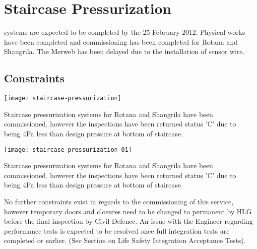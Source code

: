 
\chapter{Staircase Pressurization}
\label{pressurization}


 systems are expected to be completed by the 25 February 2012. Physical works have been completed and commissioning has been completed for Rotana and Shangrila. The Merweb has been delayed due to the installation of sensor wire. 

          

\section{Constraints}


\begin{marginfigure}
\texttt{[image: staircase-pressurization]}
\caption{Staircase pressurization systems for Rotana and Shangrila have been commissioned, however the inspections have been returned status 'C' due to being 4Pa less than design pressure at bottom of staircase.}
\end{marginfigure}

\begin{marginfigure}
\texttt{[image: staircase-pressurization-01]}
\caption{Staircase pressurization systems for Rotana and Shangrila have been commissioned, however the inspections have been returned status 'C' due to being 4Pa less than design pressure at bottom of staircase.}
\end{marginfigure}

No further constraints exist in regards to the commissioning of this service, however temporary doors and closures need to be changed to permanent by HLG before the final inspection by Civil Defence. An issue with the Engineer regarding performance tests is expected to be resolved once full integration tests are completed or earlier. (See Section on Life Safety Integration Acceptance Tests).











